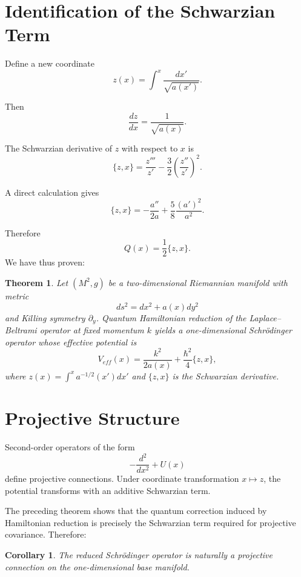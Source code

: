 \documentclass[11pt]{article}
\newtheorem{theorem}{Theorem}
\newtheorem{corollary}{Corollary}
\begin{document}
\section{Identification of the Schwarzian Term}

Define a new coordinate
\begin{equation}
z(x)=\int^x \frac{dx'}{\sqrt{a(x')}}.
\end{equation}

Then
\[
\frac{dz}{dx} = \frac{1}{\sqrt{a(x)}}.
\]

The Schwarzian derivative of $z$ with respect to $x$ is
\begin{equation}
\{z,x\}=\frac{z'''}{z'}-\frac{3}{2}\left(\frac{z''}{z'}\right)^2.
\end{equation}

A direct calculation gives
\begin{equation}
\{z,x\}=-\frac{a''}{2a}+\frac{5}{8}\frac{(a')^2}{a^2}.
\end{equation}

Therefore
\begin{equation}
Q(x)=\frac{1}{2}\{z,x\}.
\end{equation}
We have thus proven:

\begin{theorem}
Let $(M^2,g)$ be a two-dimensional Riemannian manifold with metric
\[
ds^2 = dx^2 + a(x)dy^2
\]
and Killing symmetry $\partial_y$. Quantum Hamiltonian reduction of the Laplace--Beltrami operator at fixed momentum $k$ yields a one-dimensional Schr\"odinger operator whose effective potential is
\[
V_{eff}(x)=\frac{k^2}{2a(x)}+\frac{\hbar^2}{4}\{z,x\},
\]
where $z(x)=\int^x a^{-1/2}(x')dx'$ and $\{z,x\}$ is the Schwarzian derivative.
\end{theorem}

\section{Projective Structure}

Second-order operators of the form
\[
-\frac{d^2}{dx^2} + U(x)
\]
define projective connections. Under coordinate transformation $x \mapsto z$, the potential 
transforms with an additive Schwarzian term.

The preceding theorem shows that the quantum correction induced by Hamiltonian reduction is precisely the Schwarzian term required for projective covariance. Therefore:

\begin{corollary}
The reduced Schr\"odinger operator is naturally a projective connection on the one-dimensional base manifold.
\end{corollary}
\end{document}
